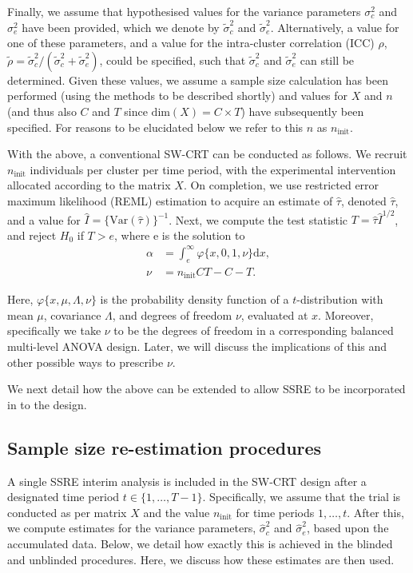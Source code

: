 \documentclass{article}
\begin{document}
Finally, we assume that hypothesised values for the variance parameters $\sigma_c^2$ and $\sigma_e^2$ have been provided, which we denote by $\tilde{\sigma}_c^2$ and $\tilde{\sigma}_e^2$. Alternatively, a value for one of these parameters, and a value for the intra-cluster correlation (ICC) $\rho$,  $\tilde{\rho} = \tilde{\sigma}_c^2/(\tilde{\sigma}_c^2 + \tilde{\sigma}_e^2)$, could be specified, such that $\tilde{\sigma}_c^2$ and $\tilde{\sigma}_e^2$ can still be determined. Given these values, we assume a sample size calculation has been performed (using the methods to be described shortly) and values for $X$ and $n$ (and thus also $C$ and $T$ since $\text{dim}⁡(X)=C\times T$) have subsequently been specified. For reasons to be elucidated below we refer to this $n$ as $n_\text{init}$.

With the above, a conventional SW-CRT can be conducted as follows. We recruit $n_\text{init}$ individuals per cluster per time period, with the experimental intervention allocated according to the matrix $X$. On completion, we use restricted error maximum likelihood (REML) estimation to acquire an estimate of $\hat{\tau}$, denoted $\hat{\tau}$, and a value for $\hat{I}=\{\text{Var}(\hat{\tau})\}^{-1}$. Next, we compute the test statistic $T=\hat{\tau}\hat{I}^{1/2}$, and reject $H_0$ if $T>e$, where e is the solution to
\begin{align*}
\alpha &= \int_e^{\infty}\varphi\{x,0,1,\nu\}\mathrm{d}x,\\
\nu &= n_\text{init}CT-C-T.
\end{align*}

Here, $\varphi\{x,\mu,\Lambda,\nu\}$ is the probability density function of a $t$-distribution with mean $\mu$, covariance $\Lambda$, and degrees of freedom $\nu$, evaluated at $x$. Moreover, specifically we take $\nu$ to be the degrees of freedom in a corresponding balanced multi-level ANOVA design. Later, we will discuss the implications of this and other possible ways to prescribe $\nu$.

We next detail how the above can be extended to allow SSRE to be incorporated in to the design.

\subsection{Sample size re-estimation procedures}\label{ssre}

A single SSRE interim analysis is included in the SW-CRT design after a designated time period $t\in\{1,\dots,T-1\}$. Specifically, we assume that the trial is conducted as per matrix $X$ and the value $n_\text{init}$ for time periods $1,\dots,t$. After this, we compute estimates for the variance parameters, $\hat{\sigma}_c^2$ and $\hat{\sigma}_e^2$, based upon the accumulated data. Below, we detail how exactly this is achieved in the blinded and unblinded procedures. Here, we discuss how these estimates are then used. 
\end{document}
